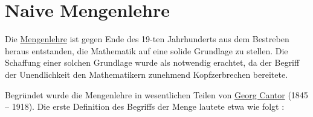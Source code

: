 \chapter{Naive Mengenlehre}
Die \href{https://de.wikipedia.org/wiki/Mengenlehre}{Mengenlehre} ist gegen Ende des 19-ten
Jahrhunderts aus dem Bestreben heraus entstanden, die Mathematik auf eine solide Grundlage zu
stellen.  Die Schaffung einer solchen Grundlage wurde als notwendig erachtet, da der Begriff der
Unendlichkeit den Mathematikern zunehmend Kopfzerbrechen bereitete.

Begr\"{u}ndet wurde die Mengenlehre in wesentlichen Teilen von
\href{https://de.wikipedia.org/wiki/Georg_Cantor}{Georg Cantor} (1845 -- 1918). 
Die erste Definition des Begriffs der Menge lautete etwa wie folgt \cite{cantor:1895}:
\vspace*{0.2cm}

\colorbox{red}{}
\vspace*{0.2cm}

